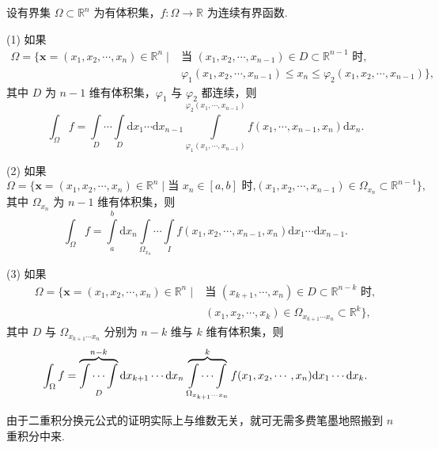 \begin{theorem}[$n$ 重积分化为累次积分]\label{thm:10.5.3}
设有界集 $\Omega \subset \mathbb{R}^n$ 为有体积集，$f\colon \Omega \to \mathbb{R}$ 为连续有界函数.

(1) 如果
\[
\begin{aligned}
\Omega = \bigl\{ \boldsymbol{x} = (x_1, x_2, \cdots, x_n) \in \mathbb{R}^n \mid&
  \text{当 } (x_1, x_2, \cdots, x_{n-1}) \in D \subset \mathbb{R}^{n-1} \text{ 时},\\
  &\varphi_1(x_1, x_2, \cdots, x_{n-1}) \leqslant x_n
    \leqslant \varphi_2(x_1, x_2, \cdots, x_{n-1}) \bigr\},
\end{aligned}
\]
其中 $D$ 为 $n-1$ 维有体积集，$\varphi_1$ 与 $\varphi_2$ 都连续，则
\[
\int_{\Omega} f = \int \limits_D \cdots \int \limits_D \mathrm{d}x_1 \cdots \mathrm{d}x_{n-1}
  \int \limits_{\varphi_1(x_1, \cdots, x_{n-1})}^{\varphi_2(x_1, \cdots, x_{n-1})}
  f(x_1, \cdots, x_{n-1}, x_n) \mathrm{d}x_n.
\]

(2) 如果
\[
\Omega = \bigl\{ \boldsymbol{x} = (x_1, x_2, \cdots, x_n) \in \mathbb{R}^n \mid
  \text{当 } x_n \in [a, b] \text{ 时,} (x_1, x_2, \cdots, x_{n-1}) \in \Omega_{x_n} \subset \mathbb{R}^{n-1} \bigr\},
\]
其中 $\Omega_{x_n}$ 为 $n-1$ 维有体积集，则
\[
\int_{\Omega} f = \int \limits_a^b \mathrm{d}x_n \int \limits_{\Omega_{x_n}} \cdots \int \limits_{I}
  f(x_1, x_2, \cdots, x_{n-1}, x_n) \mathrm{d}x_1 \cdots \mathrm{d}x_{n-1}.
\]

(3) 如果
\[
\begin{aligned}
\Omega = \bigl\{ \boldsymbol{x} = (x_1, x_2, \cdots, x_n) \in \mathbb{R}^n \mid&
  \text{当 } (x_{k+1}, \cdots, x_n) \in D \subset \mathbb{R}^{n-k} \text{ 时},\\
  &(x_1, x_2, \cdots, x_k) \in \Omega_{x_{k+1} \cdots x_n} \subset \mathbb{R}^k \bigr\},
\end{aligned}
\]
其中 $D$ 与 $\Omega_{x_{k+1} \cdots x_n}$ 分别为 $n-k$ 维与 $k$ 维有体积集，则
\[
\int_{\Omega} f
= \overbrace{\idotsint}^{n-k} \limits_{D} \mathrm{d}x_{k+1} \cdots \mathrm{d}x_n
  \overbrace{\idotsint}^{k} \limits_{\Omega_{x_{k+1} \cdots x_n}}
  f(x_1, x_2, \cdots, x_n) \mathrm{d}x_1 \cdots \mathrm{d}x_k.
\]
\end{theorem}

由于二重积分换元公式的证明实际上与维数无关，就可无需多费笔墨地照搬到 $n$ 重积分中来.


